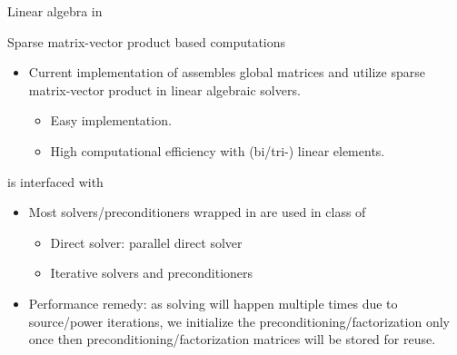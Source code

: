 \begin{frame}{Linear algebra in }
	\begin{block}{Sparse matrix-vector product based computations}
		\begin{itemize}
			\item Current implementation of  assembles global matrices and utilize sparse matrix-vector product in linear algebraic solvers.
			\begin{itemize}
				\item Easy implementation.
				\item High computational efficiency with (bi/tri-) linear elements.
			\end{itemize}
		\end{itemize}
	\end{block}
	\begin{block}{ is interfaced with }
		\begin{itemize}
			\item Most  solvers/preconditioners wrapped in  are used in  class of 
			\begin{itemize}
				\item Direct solver: parallel direct solver 
				\item Iterative solvers and preconditioners
			\end{itemize}
			\item Performance remedy: as solving will happen multiple times due to source/power iterations, we initialize the preconditioning/factorization only once then preconditioning/factorization matrices will be stored for reuse.
		\end{itemize}
	\end{block}
\end{frame}
